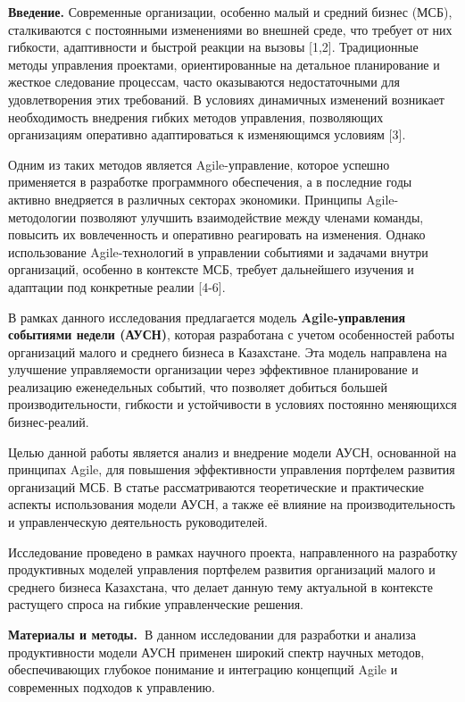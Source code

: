 {\bfseries Введение.} Современные организации, особенно малый и средний
бизнес (МСБ), сталкиваются с постоянными изменениями во внешней среде,
что требует от них гибкости, адаптивности и быстрой реакции на вызовы
{[}1,2{]}. Традиционные методы управления проектами, ориентированные на
детальное планирование и жесткое следование процессам, часто оказываются
недостаточными для удовлетворения этих требований. В условиях динамичных
изменений возникает необходимость внедрения гибких методов управления,
позволяющих организациям оперативно адаптироваться к изменяющимся
условиям {[}3{]}.

Одним из таких методов является Agile-управление, которое успешно
применяется в разработке программного обеспечения, а в последние годы
активно внедряется в различных секторах экономики. Принципы
Agile-методологии позволяют улучшить взаимодействие между членами
команды, повысить их вовлеченность и оперативно реагировать на
изменения. Однако использование Agile-технологий в управлении событиями
и задачами внутри организаций, особенно в контексте МСБ, требует
дальнейшего изучения и адаптации под конкретные реалии {[}4-6{]}.

В рамках данного исследования предлагается модель
{\bfseries Agile-управления событиями недели (АУСН)}, которая разработана с
учетом особенностей работы организаций малого и среднего бизнеса в
Казахстане. Эта модель направлена на улучшение управляемости организации
через эффективное планирование и реализацию еженедельных событий, что
позволяет добиться большей производительности, гибкости и устойчивости в
условиях постоянно меняющихся бизнес-реалий.

Целью данной работы является анализ и внедрение модели АУСН, основанной
на принципах Agile, для повышения эффективности управления портфелем
развития организаций МСБ. В статье рассматриваются теоретические и
практические аспекты использования модели АУСН, а также её влияние на
производительность и управленческую деятельность руководителей.

Исследование проведено в рамках научного проекта, направленного на
разработку продуктивных моделей управления портфелем развития
организаций малого и среднего бизнеса Казахстана, что делает данную тему
актуальной в контексте растущего спроса на гибкие управленческие
решения.

{\bfseries Материалы и методы.~}В данном исследовании для разработки и
анализа продуктивности модели АУСН применен широкий спектр научных
методов, обеспечивающих глубокое понимание и интеграцию концепций Agile
и современных подходов к управлению.

